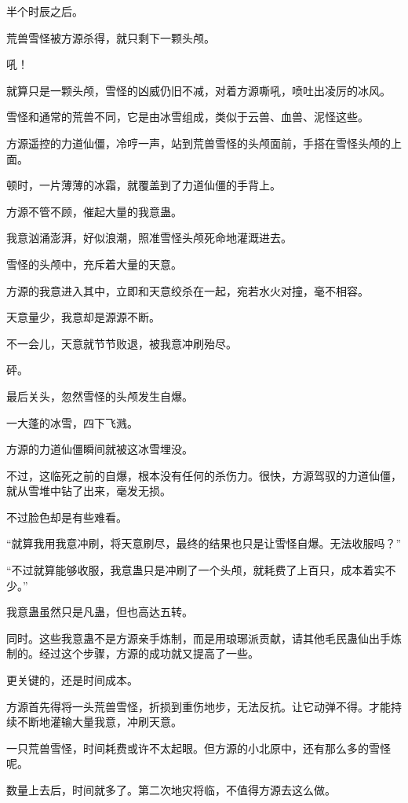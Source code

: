 
\begin{this_body}

半个时辰之后。

荒兽雪怪被方源杀得，就只剩下一颗头颅。

吼！

就算只是一颗头颅，雪怪的凶威仍旧不减，对着方源嘶吼，喷吐出凌厉的冰风。

雪怪和通常的荒兽不同，它是由冰雪组成，类似于云兽、血兽、泥怪这些。

方源遥控的力道仙僵，冷哼一声，站到荒兽雪怪的头颅面前，手搭在雪怪头颅的上面。

顿时，一片薄薄的冰霜，就覆盖到了力道仙僵的手背上。

方源不管不顾，催起大量的我意蛊。

我意汹涌澎湃，好似浪潮，照准雪怪头颅死命地灌溉进去。

雪怪的头颅中，充斥着大量的天意。

方源的我意进入其中，立即和天意绞杀在一起，宛若水火对撞，毫不相容。

天意量少，我意却是源源不断。

不一会儿，天意就节节败退，被我意冲刷殆尽。

砰。

最后关头，忽然雪怪的头颅发生自爆。

一大蓬的冰雪，四下飞溅。

方源的力道仙僵瞬间就被这冰雪埋没。

不过，这临死之前的自爆，根本没有任何的杀伤力。很快，方源驾驭的力道仙僵，就从雪堆中钻了出来，毫发无损。

不过脸色却是有些难看。

“就算我用我意冲刷，将天意刷尽，最终的结果也只是让雪怪自爆。无法收服吗？”

“不过就算能够收服，我意蛊只是冲刷了一个头颅，就耗费了上百只，成本着实不少。”

我意蛊虽然只是凡蛊，但也高达五转。

同时。这些我意蛊不是方源亲手炼制，而是用琅琊派贡献，请其他毛民蛊仙出手炼制的。经过这个步骤，方源的成功就又提高了一些。

更关键的，还是时间成本。

方源首先得将一头荒兽雪怪，折损到重伤地步，无法反抗。让它动弹不得。才能持续不断地灌输大量我意，冲刷天意。

一只荒兽雪怪，时间耗费或许不太起眼。但方源的小北原中，还有那么多的雪怪呢。

数量上去后，时间就多了。第二次地灾将临，不值得方源去这么做。


\end{this_body}
